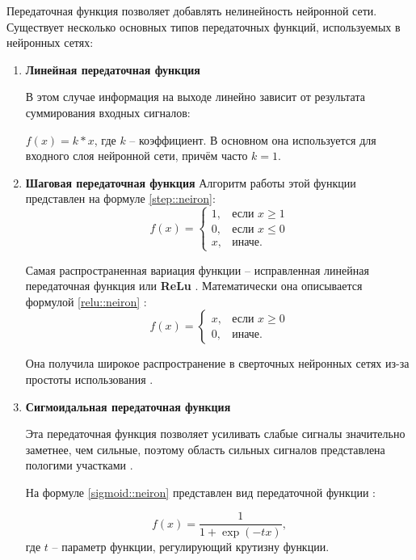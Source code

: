 Передаточная функция позволяет добавлять нелинейность нейронной сети.
Существует несколько основных типов передаточных функций, используемых в нейронных сетях:
\begin{enumerate}
	\item \textbf{Линейная передаточная функция}
	
	В этом случае информация на выходе линейно зависит от результата суммирования входных сигналов: 
	
	$f(x) = k*x$, где $k$ -- коэффициент.
	В основном она используется для входного слоя нейронной сети, причём часто $k = 1$.
	
	\item \textbf{Шаговая передаточная функция}
	Алгоритм работы этой функции представлен на формуле \eqref{step::neiron}:
	\begin{equation}
		\label{step::neiron}
		f(x)= 
		\begin{cases}
			1,& \text{если } x \geq 1\\
			0,& \text{если } x \leq 0\\
			x, & \text{иначе.}
		\end{cases}
	\end{equation}

	Самая распространенная вариация функции -- исправленная линейная передаточная функция или \textbf{ReLu} \cite{relu}.
	Математически она описывается формулой \eqref{relu::neiron} \cite{relu}:
	\begin{equation}
		\label{relu::neiron}
				f(x)= 
		\begin{cases}
			x,& \text{если } x \geq 0\\
			0,& \text{иначе.}
		\end{cases}
	\end{equation} 

	Она получила широкое распространение в сверточных нейронных сетях из-за простоты использования \cite{CNN_translate}.
	
	\item \textbf{Сигмоидальная передаточная функция}
	
	Эта передаточная функция позволяет усиливать слабые сигналы значительно заметнее, чем сильные, поэтому область сильных сигналов представлена пологими участками \cite{relu}.
	
	На формуле \eqref{sigmoid::neiron} представлен вид передаточной функции \cite{CNN_translate}:
	
	\begin{equation}
		\label{sigmoid::neiron}
		f(x) = \frac{1}{1 + \exp(-tx)},
	\end{equation}
	где $t$ -- параметр функции, регулирующий крутизну функции.
	

\end{enumerate}
